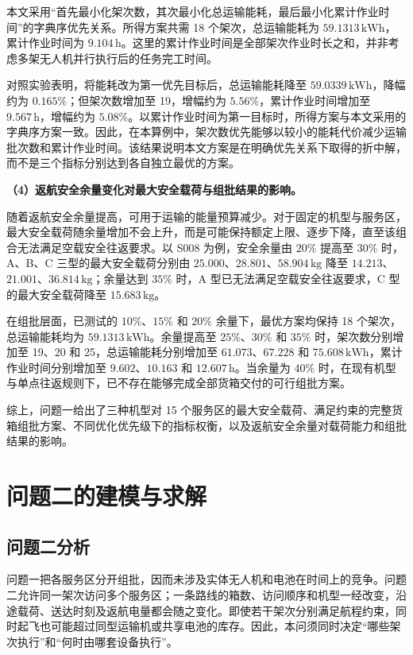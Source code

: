 \documentclass[bwprint,fontset=fandol]{gmcmthesis}
\begin{document}
本文采用“首先最小化架次数，其次最小化总运输能耗，最后最小化累计作业时间”的字典序优先关系。所得方案共需 18 个架次，总运输能耗为 $59.1313\,\mathrm{kWh}$，累计作业时间为 $9.104\,\mathrm{h}$。这里的累计作业时间是全部架次作业时长之和，并非考虑多架无人机并行执行后的任务完工时间。

对照实验表明，将能耗改为第一优先目标后，总运输能耗降至 $59.0339\,\mathrm{kWh}$，降幅约为 $0.165\%$；但架次数增加至 19，增幅约为 $5.56\%$，累计作业时间增加至 $9.567\,\mathrm{h}$，增幅约为 $5.08\%$。以累计作业时间为第一目标时，所得方案与本文采用的字典序方案一致。因此，在本算例中，架次数优先能够以较小的能耗代价减少运输批次数和累计作业时间。该结果说明本文方案是在明确优先关系下取得的折中解，而不是三个指标分别达到各自独立最优的方案。

\noindent\textbf{（4）返航安全余量变化对最大安全载荷与组批结果的影响。}

随着返航安全余量提高，可用于运输的能量预算减少。对于固定的机型与服务区，最大安全载荷随余量增加不会上升，而是可能保持额定上限、逐步下降，直至该组合无法满足空载安全往返要求。以 S008 为例，安全余量由 $20\%$ 提高至 $30\%$ 时，A、B、C 三型的最大安全载荷分别由 $25.000$、$28.801$、$58.904\,\mathrm{kg}$ 降至 $14.213$、$21.001$、$36.814\,\mathrm{kg}$；余量达到 $35\%$ 时，A 型已无法满足空载安全往返要求，C 型的最大安全载荷降至 $15.683\,\mathrm{kg}$。

在组批层面，已测试的 $10\%$、$15\%$ 和 $20\%$ 余量下，最优方案均保持 18 个架次，总运输能耗均为 $59.1313\,\mathrm{kWh}$。余量提高至 $25\%$、$30\%$ 和 $35\%$ 时，架次数分别增加至 19、20 和 25，总运输能耗分别增加至 $61.073$、$67.228$ 和 $75.608\,\mathrm{kWh}$，累计作业时间分别增加至 $9.602$、$10.163$ 和 $12.607\,\mathrm{h}$。当余量为 $40\%$ 时，在现有机型与单点往返规则下，已不存在能够完成全部货箱交付的可行组批方案。

综上，问题一给出了三种机型对 15 个服务区的最大安全载荷、满足约束的完整货箱组批方案、不同优化优先级下的指标权衡，以及返航安全余量对载荷能力和组批结果的影响。
\FloatBarrier

\section{问题二的建模与求解}
\subsection{问题二分析}
问题一把各服务区分开组批，因而未涉及实体无人机和电池在时间上的竞争。问题二允许同一架次访问多个服务区；一条路线的箱数、访问顺序和机型一经改变，沿途载荷、送达时刻及返航电量都会随之变化。即使若干架次分别满足航程约束，同时起飞也可能超过同型运输机或共享电池的库存。因此，本问须同时决定“哪些架次执行”和“何时由哪套设备执行”。
\end{document}
